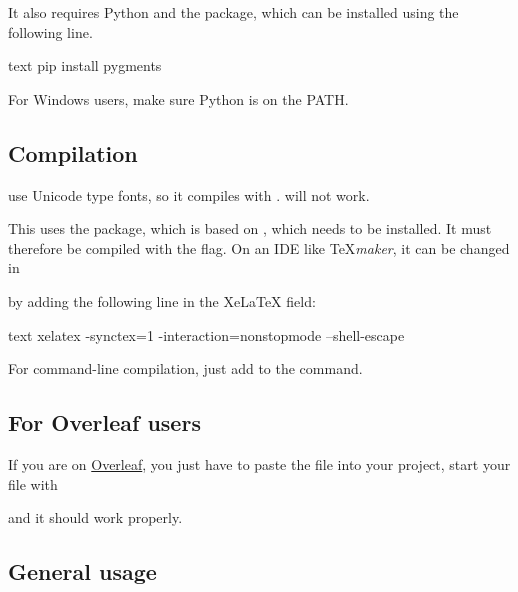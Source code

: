 \documentclass[a4paper, 11pt]{old-dms}
\begin{document}
It also requires Python and the  package, which can be installed using the following line.
\begin{codeboxnonos}{text}
pip install pygments
\end{codeboxnonos}

For Windows users, make sure Python is on the PATH.


\subsection{Compilation}

 use Unicode type fonts, so it compiles with .  will not work.

This uses the  package, which is based on , which needs to be installed. It must therefore be compiled with the  flag. On an IDE like \TeX \textit{maker}, it can be changed in


by adding the following line in the XeLaTeX field:

\begin{codeboxnonos}{text}
xelatex -synctex=1 -interaction=nonstopmode --shell-escape %
\end{codeboxnonos}

For command-line compilation, just add  to the command.

\subsection{For Overleaf users}
\label{subsec:overleaf-users}

If you are on \href{www.overleaf.com}{Overleaf}, you just have to paste the  file into your project, start your  file with


and it should work properly.


\subsection{General usage}
\end{document}
